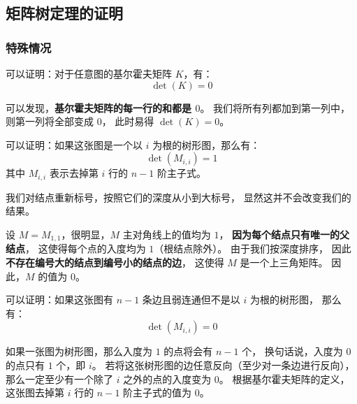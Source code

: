 \documentclass[UTF8]{article}
\begin{document}
	\subsection{矩阵树定理的证明}

	\subsubsection{特殊情况}


	可以证明：对于任意图的基尔霍夫矩阵 $K$，有：
	$$
	\det(K) = 0
	$$

	\bigskip


	可以发现，\textbf{基尔霍夫矩阵的每一行的和都是 $0$}。
	我们将所有列都加到第一列中，则第一列将全部变成 $0$，
	此时易得 $\det(K) = 0$。

	\bigskip


	可以证明：如果这张图是一个以 $i$ 为根的树形图，那么有：
	$$
	\det(M_{i, i}) = 1
	$$
	其中 $M_{i, i}$ 表示去掉第 $i$ 行的 $n - 1$ 阶主子式。

	\bigskip


	我们对结点重新标号，按照它们的深度从小到大标号，
	显然这并不会改变我们的结果。

	设 $M = M_{1, 1}$，很明显，$M$ 主对角线上的值均为 $1$，
	\textbf{因为每个结点只有唯一的父结点}，
	这使得每个点的入度均为 $1$（根结点除外）。
	由于我们按深度排序，
	因此\textbf{不存在编号大的结点到编号小的结点的边}，
	这使得 $M$ 是一个上三角矩阵。
	因此，$M$ 的值为 $0$。

	\bigskip


	可以证明：如果这张图有 $n - 1$ 条边且弱连通但不是以 $i$ 为根的树形图，
	那么有：
	$$
	\det(M_{i, i}) = 0
	$$

	\bigskip


	如果一张图为树形图，那么入度为 $1$ 的点将会有 $n - 1$ 个，
	换句话说，入度为 $0$ 的点只有 $1$ 个，即 $i$。
	若将这张树形图的边任意反向（至少对一条边进行反向），
	那么一定至少有一个除了 $i$ 之外的点的入度变为 $0$。
	根据基尔霍夫矩阵的定义，
	这张图去掉第 $i$ 行的 $n - 1$ 阶主子式的值为 $0$。

	\bigskip
\end{document}
